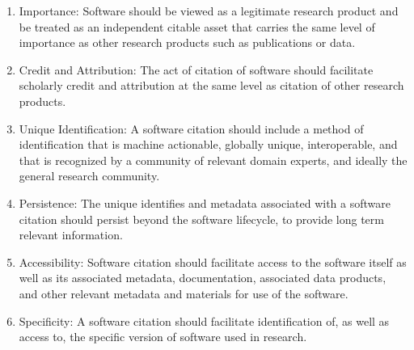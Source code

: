 \begin{enumerate}
    \item Importance: Software should be viewed as a legitimate research product and be treated as an independent citable asset that carries the same level of importance as other research products such as publications or data.
    \item Credit and Attribution: The act of citation of software should facilitate scholarly credit and attribution at the same level as citation of other research products.
    \item Unique Identification: A software citation should include a method of identification that is machine actionable, globally unique, interoperable, and that is recognized by a community of relevant domain experts, and ideally the general research community.
    \item Persistence: The unique identifies and metadata associated with a software citation should persist beyond the software lifecycle, to provide long term relevant information.
    \item Accessibility: Software citation should facilitate access to the software itself as well as its associated metadata, documentation, associated data products, and other relevant metadata and materials for use of the software.
    \item Specificity: A software citation should facilitate identification of, as well as access to, the specific version of software used in research.
\end{enumerate}


